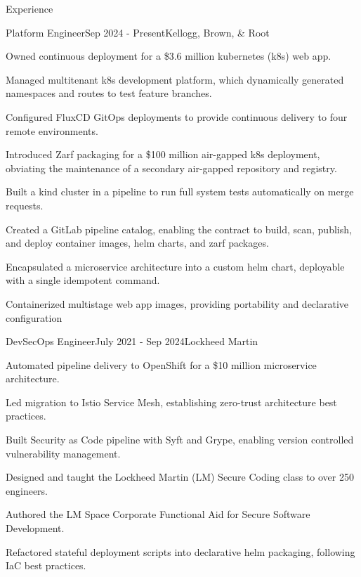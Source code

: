 \documentclass[
	a4paper, %
	11pt, %
]{resume} %
\begin{document}
\begin{rSection}{Experience}

	\begin{rSubsection}{Platform Engineer}{Sep 2024 - Present}{Kellogg, Brown, \& Root}
		\item Owned continuous deployment for a \$3.6 million kubernetes (k8s) web app.
		\item Managed multitenant k8s development platform, which dynamically generated namespaces and routes to test feature branches.
		\item Configured FluxCD GitOps deployments to provide continuous delivery to four remote environments.
		\item Introduced Zarf packaging for a \$100 million air-gapped k8s deployment, obviating the maintenance of a secondary air-gapped repository and registry.
		\item Built a kind cluster in a pipeline to run full system tests automatically on merge requests.
		\item Created a GitLab pipeline catalog, enabling the contract to build, scan, publish, and deploy container images, helm charts, and zarf packages.
		\item Encapsulated a microservice architecture into a custom helm chart, deployable with a single idempotent command.
		\item Containerized multistage web app images, providing portability and declarative configuration
	\end{rSubsection}
	\begin{rSubsection}{DevSecOps Engineer}{July 2021 - Sep 2024}{Lockheed Martin}
		\item Automated pipeline delivery to OpenShift for a \$10 million microservice architecture.
		\item Led migration to Istio Service Mesh, establishing zero-trust architecture best practices.
		\item Built Security as Code pipeline with Syft and Grype, enabling version controlled vulnerability management.
		\item Designed and taught the Lockheed Martin (LM) Secure Coding class to over 250 engineers.
		\item Authored the LM Space Corporate Functional Aid for Secure Software Development.
		\item Refactored stateful deployment scripts into declarative helm packaging, following IaC best practices.

\end{rSubsection}
\end{rSection}
\end{document}
